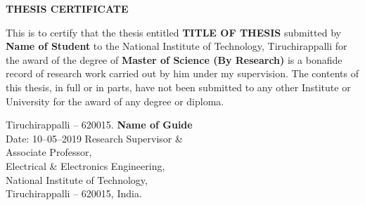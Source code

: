 \pagestyle{empty}
\centerline{\textbf{\normalsize THESIS CERTIFICATE}}
\smallskip

\indent This is to certify that the thesis entitled {\normalsize \bfseries TITLE OF THESIS} submitted by \textbf{Name of Student} to the National Institute of Technology, Tiruchirappalli for the award of the degree of \textbf{Master of Science (By Research)} is a bonafide record of research work carried out by him under my supervision. The contents of this thesis, in full or in parts, have not been submitted to any other Institute or University for the award of any degree or diploma.
\vspace{3cm}
\begin{tabbing}
Tiruchirappalli -- 620015. \quad\hspace{3.5cm}\={\bf Name of Guide}\\[0.5em] 
Date: 10--05--2019    \quad  \>Research Supervisor \&\\[-0.4em]
  \quad \>Associate Professor,\\[-0.4em]
  \quad \>Electrical \& Electronics Engineering,\\[-0.4em]
  \quad \>National Institute of Technology,\\[-0.4em]
  \quad \>Tiruchirappalli -- 620015, India.\\\\\\\\\\\\
\end{tabbing}    	

\newpage 